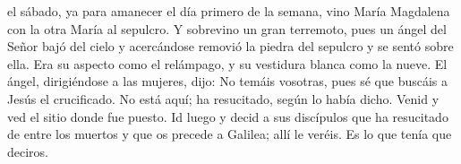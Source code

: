  el sábado, ya para amanecer el día primero de la semana, vino María Magdalena con la otra María al sepulcro. Y sobrevino un gran terremoto,
pues un ángel del Señor bajó del cielo y acercándose removió la piedra del sepulcro y se sentó sobre ella. Era su aspecto como el relámpago, y su vestidura blanca como la nueve.
El ángel, dirigiéndose a las mujeres, dijo: No temáis vosotras, pues sé que buscáis a Jesús el crucificado. No está aquí; ha resucitado, según lo había dicho.
Venid y ved el sitio donde fue puesto. Id luego y decid a sus discípulos que ha resucitado de entre los muertos y que os precede a Galilea; allí le veréis.
Es lo que tenía que deciros. 